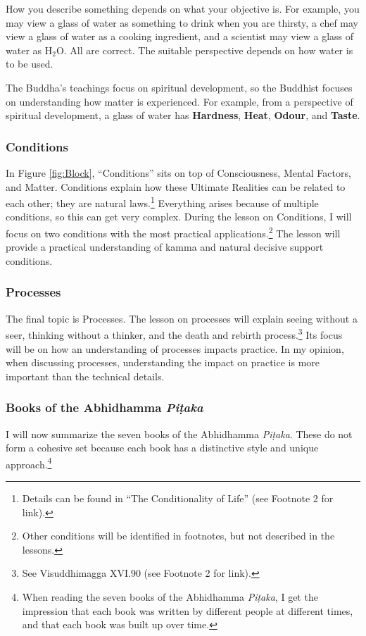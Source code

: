 How you describe something depends on what your objective is. For example, you may view a glass of water as something to drink when you are thirsty, a chef may view a glass of water as a cooking ingredient, and a scientist may view a glass of water as H$_{2}$O. All are correct. The suitable perspective depends on how water is to be used.

The Buddha’s teachings focus on spiritual development, so the Buddhist focuses on understanding how matter is experienced. For example, from a perspective of spiritual development, a glass of water has \textbf{Hardness}, \textbf{Heat}, \textbf{Odour}, and \textbf{Taste}.

\subsubsection*{Conditions}

In Figure \ref{fig:Block}, “Conditions” sits on top of Consciousness, Mental Factors, and Matter. Conditions explain how these Ultimate Realities can be related to each other; they are natural laws.\footnote{Details can be found in “The Conditionality of Life” (see Footnote 2 for link).} Everything arises because of multiple conditions, so this can get very complex. During the lesson on Conditions, I will focus on two conditions with the most practical applications.\footnote{Other conditions will be identified in footnotes, but not described in the lessons.} The lesson will provide a practical understanding of kamma and natural decisive support conditions. 

\subsubsection*{Processes}

The final topic is Processes. The lesson on processes will explain seeing without a seer, thinking without a thinker, and the death and rebirth process.\footnote{See Visuddhimagga XVI.90 (see Footnote 2 for link).} Its focus will be on how an understanding of processes impacts practice. In my opinion, when discussing processes, understanding the impact on practice is more important than the technical details.

\subsubsection*{Books of the Abhidhamma \textit{Piṭaka}}

I will now summarize the seven books of the Abhidhamma \textit{Piṭaka}. These do not form a cohesive set because each book has a distinctive style and unique approach.\footnote{When reading the seven books of the Abhidhamma \textit{Piṭaka}, I get the impression that each book was written by different people at different times, and that each book was built up over time.}

